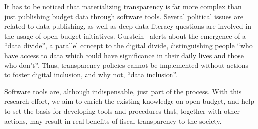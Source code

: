 It has to be noticed that materializing transparency is far more complex than just publishing budget data through software tools.
Several political issues are related to data publishing, as well as deep data literacy questions are involved in the usage of open budget initiatives.
Gurstein~\cite{Gurstein2011} alerts about the emergence of a ``data divide'', a parallel concept to the digital divide, distinguishing people ``who have access to data which could have significance in their daily lives and those who don't''.
Thus, transparency policies cannot be implemented without actions to foster digital inclusion, and why not, ``data inclusion''.

Software tools are, although indispensable, just part of the process. 
With this research effort, we aim to enrich the existing knowledge on open budget, and help to set the basis for developing tools and procedures that, together with other actions, may result in real benefits of fiscal transparency to the society. 

\newcommand{\rot}[1]{\begin{sideways}#1\end{sideways}}


